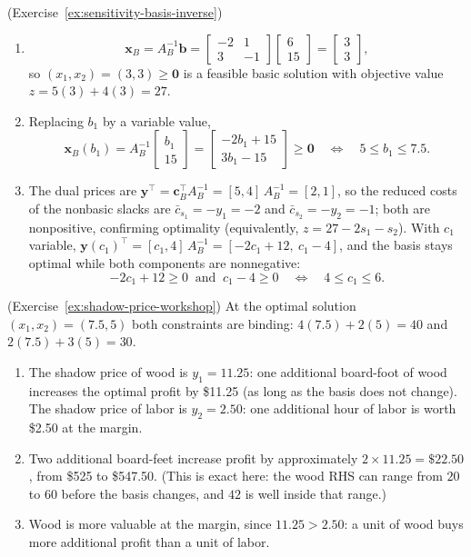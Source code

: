 \begin{solution}(Exercise~\ref{ex:sensitivity-basis-inverse})
\begin{enumerate}
\item
\[
\mathbf{x}_B = A_B^{-1}\mathbf{b} = \begin{bmatrix} -2 & 1 \\ 3 & -1 \end{bmatrix}\begin{bmatrix} 6 \\ 15 \end{bmatrix} = \begin{bmatrix} 3 \\ 3 \end{bmatrix},
\]
so $(x_1, x_2) = (3, 3) \geq \mathbf{0}$ is a feasible basic solution with objective value $z = 5(3) + 4(3) = 27$.
\item Replacing $b_1$ by a variable value,
\[
\mathbf{x}_B(b_1) = A_B^{-1}\begin{bmatrix} b_1 \\ 15 \end{bmatrix} = \begin{bmatrix} -2b_1 + 15 \\ 3b_1 - 15 \end{bmatrix} \geq \mathbf{0}
\quad\Longleftrightarrow\quad 5 \leq b_1 \leq 7.5.
\]
\item The dual prices are $\mathbf{y}^\top = \mathbf{c}_B^\top A_B^{-1} = [5, 4]\, A_B^{-1} = [2, 1]$, so the reduced costs of the nonbasic slacks are $\bar{c}_{s_1} = -y_1 = -2$ and $\bar{c}_{s_2} = -y_2 = -1$; both are nonpositive, confirming optimality (equivalently, $z = 27 - 2s_1 - s_2$).  With $c_1$ variable, $\mathbf{y}(c_1)^\top = [c_1, 4]\, A_B^{-1} = [-2c_1 + 12,\ c_1 - 4]$, and the basis stays optimal while both components are nonnegative:
\[
-2c_1 + 12 \geq 0 \ \text{ and } \ c_1 - 4 \geq 0
\quad\Longleftrightarrow\quad 4 \leq c_1 \leq 6.
\]
\end{enumerate}
\end{solution}

\begin{solution}(Exercise~\ref{ex:shadow-price-workshop})
At the optimal solution $(x_1, x_2) = (7.5, 5)$ both constraints are binding: $4(7.5) + 2(5) = 40$ and $2(7.5) + 3(5) = 30$.

\begin{enumerate}
\item The shadow price of wood is $y_1 = 11.25$: one additional board-foot of wood increases the optimal profit by \$11.25 (as long as the basis does not change).  The shadow price of labor is $y_2 = 2.50$: one additional hour of labor is worth \$2.50 at the margin.
\item Two additional board-feet increase profit by approximately $2 \times 11.25 = \$22.50$, from \$525 to \$547.50.  (This is exact here: the wood RHS can range from $20$ to $60$ before the basis changes, and $42$ is well inside that range.)
\item Wood is more valuable at the margin, since $11.25 > 2.50$: a unit of wood buys more additional profit than a unit of labor.
\end{enumerate}
\end{solution}

